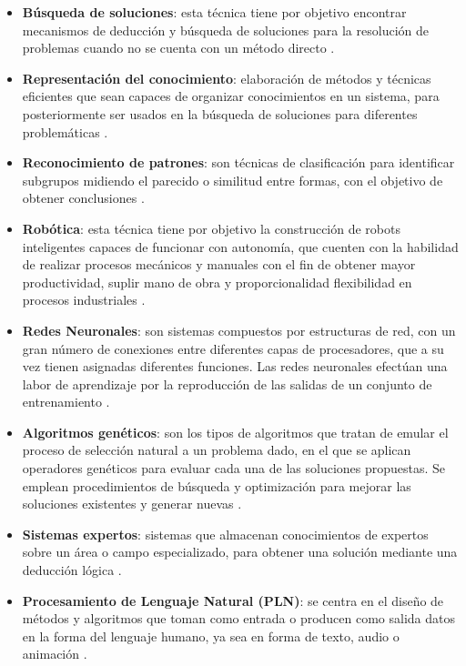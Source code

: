 \begin{itemize}
    \item \textbf{Búsqueda de soluciones}: esta técnica tiene por objetivo encontrar mecanismos de deducción y búsqueda de soluciones para la resolución de problemas cuando no se cuenta con un método directo \cite{ref43}.\\
    \item \textbf{Representación del conocimiento}: elaboración de métodos y técnicas eficientes que sean capaces de organizar conocimientos en un sistema, para posteriormente ser usados en la búsqueda de soluciones para diferentes problemáticas \cite{ref43}.\\
    \item \textbf{Reconocimiento de patrones}: son técnicas de clasificación para identificar subgrupos midiendo el parecido o similitud entre formas, con el objetivo de obtener conclusiones \cite{ref43}.\\
    \item \textbf{Robótica}: esta técnica tiene por objetivo la construcción de robots inteligentes capaces de funcionar con autonomía, que cuenten con la habilidad de realizar procesos mecánicos y manuales con el fin de obtener mayor productividad, suplir mano de obra y proporcionalidad flexibilidad en procesos industriales \cite{ref43}.\\
    \item \textbf{Redes Neuronales}: son sistemas compuestos por estructuras de red, con un gran número de conexiones entre diferentes capas de procesadores, que a su vez tienen asignadas diferentes funciones. Las redes neuronales efectúan una labor de aprendizaje por la reproducción de las salidas de un conjunto de entrenamiento \cite{ref43}.\\
    \item \textbf{Algoritmos genéticos}: son los tipos de algoritmos que tratan de emular el proceso de selección natural a un problema dado, en el que se aplican operadores genéticos para evaluar cada una de las soluciones propuestas. Se emplean procedimientos de búsqueda y optimización para mejorar las soluciones existentes y generar nuevas \cite{ref43}.\\
    \item \textbf{Sistemas expertos}: sistemas que almacenan conocimientos de expertos sobre un área o campo especializado, para obtener una solución mediante una deducción lógica \cite{ref43}. \\
    \item \textbf{Procesamiento de Lenguaje Natural (PLN)}: se centra en el diseño de métodos y algoritmos que toman como entrada o producen como salida datos en la forma del lenguaje humano, ya sea en forma de texto, audio o animación \cite{ref44}.
\end{itemize}

